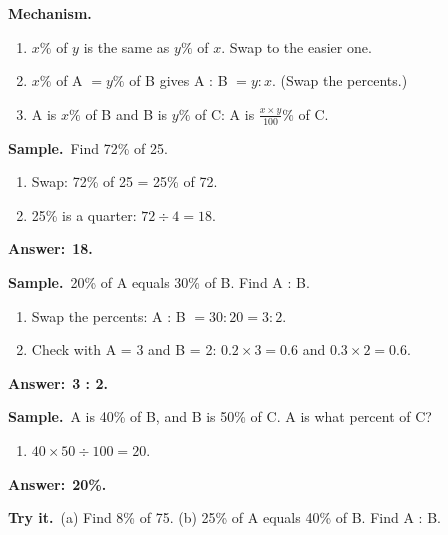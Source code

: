 \documentclass[11pt,a4paper]{article}
\newcommand{\mech}{\textbf{\color{ember}Mechanism.}\ }
\newif\ifkeepsamp
\newcommand{\ans}[1]{\par\nopagebreak\noindent\textbf{\color{ember}Answer:}\ \textbf{#1}\par}
\newcommand{\samp}{\ifkeepsamp\needspace{4\baselineskip}\fi\textbf{\color{ember}Sample.}\ }
\newcommand{\tryit}[1]{\textbf{\color{ember}Try it.}\ #1}
\begin{document}
\mech
\begin{enumerate}
\item $x\%$ of $y$ is the same as $y\%$ of $x$. Swap to the easier one.
\item $x\%$ of A $= y\%$ of B gives A : B $= y : x$. (Swap the percents.)
\item A is $x\%$ of B and B is $y\%$ of C: A is $\tfrac{x \times y}{100}\%$ of C.
\end{enumerate}

\samp Find 72\% of 25.
\begin{enumerate}
\item Swap: 72\% of 25 = 25\% of 72.
\item 25\% is a quarter: $72 \div 4 = 18$.
\end{enumerate}
\ans{18.}

\samp 20\% of A equals 30\% of B. Find A : B.
\begin{enumerate}
\item Swap the percents: A : B $= 30 : 20 = 3 : 2$.
\item Check with A = 3 and B = 2: $0.2 \times 3 = 0.6$ and $0.3 \times 2 = 0.6$.
\end{enumerate}
\ans{3 : 2.}

\samp A is 40\% of B, and B is 50\% of C. A is what percent of C?
\begin{enumerate}
\item $40 \times 50 \div 100 = 20$.
\end{enumerate}
\ans{20\%.}

\tryit (a) Find 8\% of 75. (b) 25\% of A equals 40\% of B. Find A : B.
\end{document}
